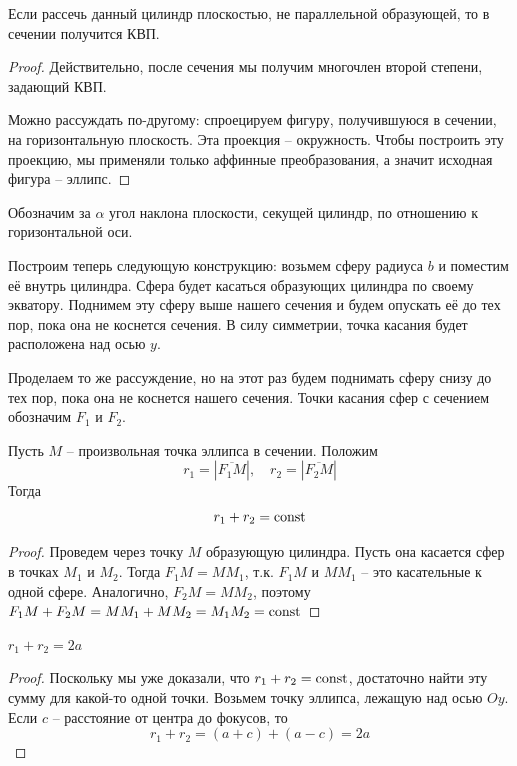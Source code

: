 \begin{Prop}
	Если рассечь данный цилиндр плоскостью, не параллельной образующей, то в сечении получится КВП.
\end{Prop}

\begin{proof}
	Действительно, после сечения мы получим многочлен второй степени, задающий КВП.

	Можно рассуждать по-другому: спроецируем фигуру, получившуюся в сечении, на горизонтальную плоскость. Эта проекция -- окружность.
	Чтобы построить эту проекцию, мы применяли только аффинные преобразования, а значит исходная фигура -- эллипс.
\end{proof}

Обозначим за $\alpha$ угол наклона плоскости, секущей цилиндр, по отношению к горизонтальной оси.

Построим теперь следующую конструкцию: возьмем сферу радиуса $b$ и поместим её внутрь цилиндра. Сфера будет касаться образующих цилиндра по своему экватору.
Поднимем эту сферу выше нашего сечения и будем опускать её до тех пор, пока она не коснется сечения.
В силу симметрии, точка касания будет расположена над осью $y$.

Проделаем то же рассуждение, но на этот раз будем поднимать сферу снизу до тех пор, пока она не коснется нашего сечения.
Точки касания сфер с сечением обозначим $F_1$ и $F_2$. 

\begin{Property}
	Пусть $M$ -- произвольная точка эллипса в сечении. Положим
	\[r_1 = |\overline{F_1 M}|, \quad r_2 = |\overline{F_2 M}|\]
	Тогда
	\[r_1 + r_2 = \operatorname{const}\]
\end{Property}

\begin{proof}
	Проведем через точку $M$ образующую цилиндра. Пусть она касается сфер в точках $M_1$ и $M_2$.
	Тогда $F_1 M = M M_1$, т.к. $F_1 M$ и $M M_1$ -- это касательные к одной сфере. Аналогично, $F_2 M = M M_2$, поэтому
	$F_1 M + F_2 M = M M_1 + M M_2 = M_1 M_2 = \operatorname{const}$ 
\end{proof}

\begin{Cons}
	$r_1 + r_2 = 2a$
\end{Cons}

\begin{proof}
	Поскольку мы уже доказали, что $r_1 + r_2 = \operatorname{const}$, достаточно найти эту сумму для какой-то одной точки. 
	Возьмем точку эллипса, лежащую над осью $Oy$. 
	Если $c$ -- расстояние от центра до фокусов, то
	\[r_1 + r_2 = (a + c) + (a - c) = 2a\]
\end{proof}

